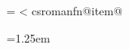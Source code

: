 \makeatletter

\def\footnoterule{%
  \kern-3\p@
  \hrule\@width\columnwidth\@height.4pt
  \kern10\p@
}

%

\newcount\csromanfn@n
\newcount\csromanfn@i
\newcount\csromanfn@cursor
\newcount\csromanfn@span
\newcount\csromanfn@free
\newcount\csromanfn@slot
\newcount\csromanfn@usedcols
\newdimen\csromanfn@colsep
\newdimen\csromanfn@colw
\newdimen\csromanfn@spanw
\newdimen\csromanfn@spanwii
\newdimen\csromanfn@spantol
\newdimen\csromanfn@nat
\newdimen\csromanfn@sum
\newdimen\csromanfn@rowsep
\newdimen\csromanfn@marksep
\setlength{\csromanfn@marksep}{0.25em}
\newbox\csromanfn@box
\newbox\csromanfn@tmp
\newbox\csromanfn@row
\newbox\csromanfn@head
\newbox\csromanfn@last
\newbox\csromanfn@cell
\newif\ifcsromanfn@anyrow
\newif\ifcsromanfn@longitem
\newif\ifcsromanfn@runin
\newif\ifcsromanfn@pair
\newif\ifcsromanfn@defer
\newtoks\csromanfn@deferred

\newcount\csromanfn@maxitems
{}
\csromanfn@i=\z@
\loop
  \ifnum\csromanfn@i<\csromanfn@maxitems
    \advance\csromanfn@i\@ne
    \expandafter\newbox\csname csromanfn@item@\the\csromanfn@i\endcsname
\repeat

\csromanfn@colsep=1.25em
\csromanfn@rowsep=1.5pt
\csromanfn@spantol=4pt

\def\csromanfn@reset{%
  \global\csromanfn@n=\z@
  \global\csromanfn@deferfalse
  \global\csromanfn@deferred={}%
  \csromanfn@clearrow
  \csromanfn@clearrunin
}

\def\csromanfn@clearrow{%
  \global\csromanfn@cursor=\z@
  \global\setbox\csromanfn@row=\hbox{}%
}

